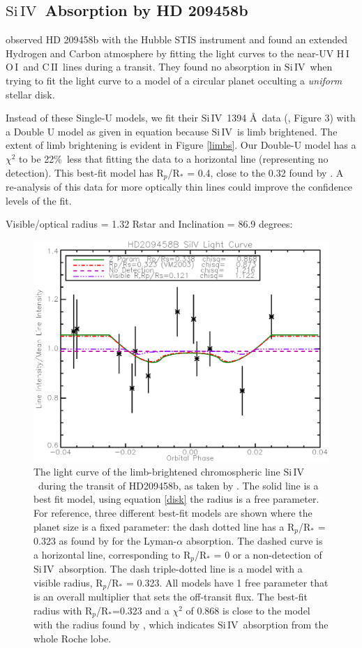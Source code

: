 \documentclass[manuscript]{aastex}
\newcommand{\cii}{\ensuremath{\mathrm{C}\,\scriptstyle \mathrm{II}}}
\newcommand{\oi}{\ensuremath{\mathrm{O}\,\scriptstyle \mathrm{I}}}
\newcommand{\hi}{\ensuremath{\mathrm{H}\,\scriptstyle \mathrm{I}}}
\newcommand{\siIV}{\ensuremath{\mathrm{Si}\,\scriptstyle \mathrm{IV}}}
\begin{document}
\subsection{\siIV\ Absorption by HD 209458b}

\citet{viddisc} observed HD 209458b with the Hubble STIS instrument and found
an extended Hydrogen and Carbon atmosphere by fitting the light curves
to the near-UV \hi\, \oi\ and \cii\ lines during a transit. They found no absorption in \siIV\ when trying to fit the light curve to a model of a circular planet occulting a {\it uniform} stellar disk.

Instead of these Single-U models, we fit their \siIV\ 1394 \AA\ data (\citep{vidmad}, Figure 3) with a Double U model as given in equation \label{disk} because \siIV\ is limb brightened. The extent of limb brightening is evident in Figure \ref{limbs}. Our Double-U model has a $\chi^2$ to be 22\%\ less that fitting the data to
a horizontal line (representing no detection). This best-fit model has
R$_p$/R$_*$ = 0.4, close to the 0.32 found by \citet{vidmad}. A
re-analysis of this data for more optically thin lines could improve
the confidence levels of the fit.

Visible/optical radius = 1.32 Rstar and Inclination = 86.9 degrees:   \citet{knutsonprop}

\begin{figure}[!ht]
\includegraphics[width=0.9 \textwidth]{hd209458.eps}
\caption{The light curve of the limb-brightened chromospheric line \siIV\ during the transit of HD209458b, as taken by \citet{vidmad}. The solid line is a best fit model, using equation \ref{disk}  the radius is a free parameter. For reference, three different best-fit models are shown where the planet size is a fixed parameter: the dash dotted line has a R$_p$/R$_*$ = 0.323 as found by \citet{vidmad} for the Lyman-$\alpha$ absorption. The dashed curve is a horizontal line, corresponding to R$_p$/R$_*$ = 0 or a non-detection of \siIV\ absorption. The dash triple-dotted line is a model with a visible radius, R$_p$/R$_*$ = 0.323. All models have 1 free parameter that is an overall multiplier that sets the off-transit flux. The best-fit radius with R$_p$/R$_*$=0.323 and a $\chi^2$ of 0.868 is close to the model with the radius found by \citet{vidmad}, which indicates \siIV\ absorption from the whole Roche lobe. }
\label{fig03}
\end{figure}
\end{document}

